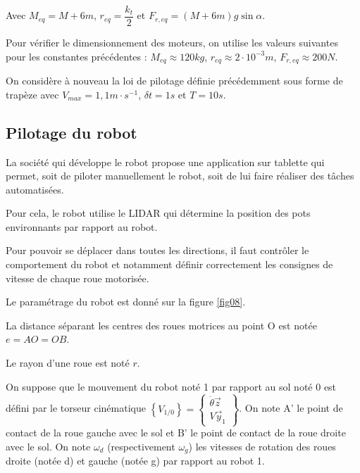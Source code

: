 Avec $M_{eq}=M+6m$, $r_{eq}=\dfrac{k_t}{2}$ et $F_{r,eq}=(M+6m)g\sin\alpha$.

Pour vérifier le dimensionnement des moteurs, on utilise les valeurs suivantes pour les constantes précédentes : $M_{eq}\approx 120 kg$, $r_{eq}\approx 2\cdot 10^{-3} m$, $F_{r,eq}\approx 200 N$.

On considère à nouveau la loi de pilotage définie précédemment sous forme de trapèze avec $V_{max} = 1,1 m\cdot s^{-1}$, $\delta t=1s$ et $T=10s$.



\subsection{Pilotage du robot}

La société qui développe le robot propose une application sur tablette qui permet, soit de piloter manuellement le robot, soit de lui faire réaliser des tâches automatisées. 

Pour cela, le robot utilise le LIDAR qui détermine la position des pots environnants par rapport au robot.

Pour pouvoir se déplacer dans toutes les directions, il faut contrôler le comportement du robot et notamment définir correctement les consignes de vitesse de chaque roue motorisée.

Le paramétrage du robot est donné sur la figure \ref{fig08}.

La distance séparant les centres des roues motrices au point O est notée $e=AO=OB$. 

Le rayon d'une roue est noté $r$.

On suppose que le mouvement du robot noté 1 par rapport au sol noté 0 est défini par le torseur cinématique $\left\{V_{1/0}\right\}=\left\{\begin{array}{c}\dot{\theta}\vec{z}\\V\vec{y}_1\end{array}\right\}$. On note A' le point de contact de la roue gauche avec le sol et B' le point de contact de la roue droite avec le sol. On note $\omega_d$ (respectivement $\omega_g$) les vitesses de rotation des roues droite (notée d) et gauche (notée g) par rapport au robot 1.

